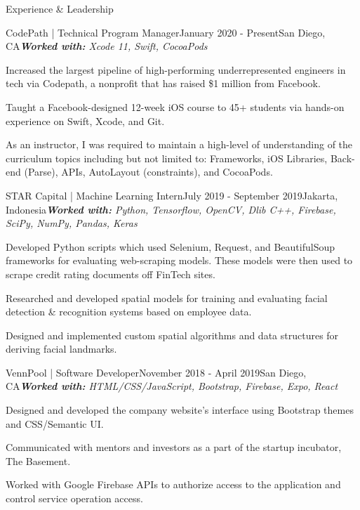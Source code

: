 \documentclass{resume} %
\begin{document}

\begin{rSection}{\faCode{ }}{Experience \& Leadership}

\begin{rSubsection}{}{CodePath | {\normalfont Technical Program Manager}}{January 2020 - Present}{}{San Diego, CA}{\it \textbf{Worked with:} Xcode 11, Swift, CocoaPods }
\item Increased the largest pipeline of high-performing underrepresented engineers in tech via
Codepath, a nonprofit that has raised \$1 million from Facebook.
\item Taught a Facebook-designed 12-week iOS course to 45+ students via hands-on experience on Swift, Xcode, and Git.
\item As an instructor, I was required to maintain a high-level of understanding of the curriculum topics including but not limited to: Frameworks, iOS Libraries, Back-end (Parse), APIs, AutoLayout (constraints), and CocoaPods.
\end{rSubsection}

\begin{rSubsection}{}{STAR Capital | {\normalfont Machine Learning Intern}}{July 2019 - September 2019}{}{Jakarta, Indonesia}{\it \textbf{Worked with:} Python, Tensorflow, OpenCV, Dlib C++, Firebase, SciPy, NumPy, Pandas, Keras}
\item Developed Python scripts which used Selenium, Request, and BeautifulSoup frameworks for evaluating web-scraping models. These models were then used to scrape credit rating documents off FinTech sites.
\item Researched and developed spatial models for training and evaluating facial detection \& recognition systems based on employee data. 
\item Designed	and	implemented custom spatial algorithms and data structures for deriving facial landmarks.
\end{rSubsection}

\begin{rSubsection}{}{VennPool | {\normalfont Software Developer}}{November 2018 - April 2019}{}{San Diego, CA}{\it \textbf{Worked with:} HTML/CSS/JavaScript, Bootstrap, Firebase, Expo, React}
\item Designed and developed the company website’s interface using Bootstrap themes and CSS/Semantic UI.
\item Communicated with mentors and investors as a part of the startup incubator, The Basement.
\item Worked with Google Firebase APIs to authorize access to the application and control service operation access.
\end{rSubsection}

\end{rSection}
\end{document}
